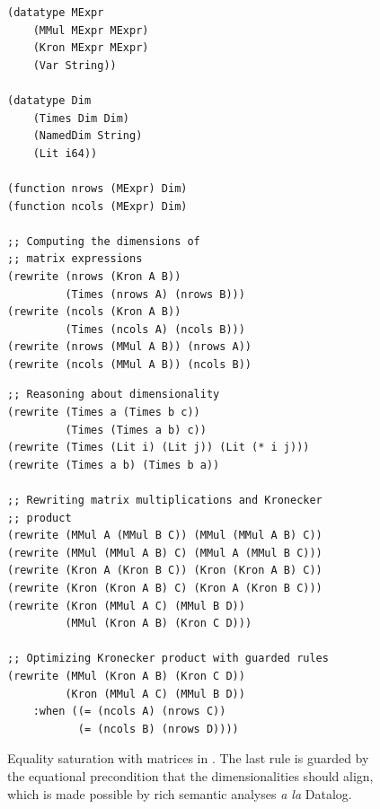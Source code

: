 \begin{figure}
\begin{minipage}[t]{0.42\linewidth}
    \begin{lstlisting}[language=egglog]
(datatype MExpr
    (MMul MExpr MExpr)
    (Kron MExpr MExpr)
    (Var String))

(datatype Dim
    (Times Dim Dim)
    (NamedDim String)
    (Lit i64))

(function nrows (MExpr) Dim)
(function ncols (MExpr) Dim)

;; Computing the dimensions of
;; matrix expressions
(rewrite (nrows (Kron A B))
         (Times (nrows A) (nrows B)))
(rewrite (ncols (Kron A B))
         (Times (ncols A) (ncols B)))
(rewrite (nrows (MMul A B)) (nrows A))
(rewrite (ncols (MMul A B)) (ncols B))
\end{lstlisting}
\end{minipage}
\begin{minipage}[t]{0.50\linewidth}
    \begin{lstlisting}[language=egglog]
;; Reasoning about dimensionality
(rewrite (Times a (Times b c))
         (Times (Times a b) c))
(rewrite (Times (Lit i) (Lit j)) (Lit (* i j)))
(rewrite (Times a b) (Times b a))

;; Rewriting matrix multiplications and Kronecker
;; product
(rewrite (MMul A (MMul B C)) (MMul (MMul A B) C))
(rewrite (MMul (MMul A B) C) (MMul A (MMul B C)))
(rewrite (Kron A (Kron B C)) (Kron (Kron A B) C))
(rewrite (Kron (Kron A B) C) (Kron A (Kron B C)))
(rewrite (Kron (MMul A C) (MMul B D))
         (MMul (Kron A B) (Kron C D)))

;; Optimizing Kronecker product with guarded rules
(rewrite (MMul (Kron A B) (Kron C D))
         (Kron (MMul A C) (MMul B D))
    :when ((= (ncols A) (nrows C))
           (= (ncols B) (nrows D))))
\end{lstlisting}
\end{minipage}
\caption{Equality saturation with matrices in \egglog.
The last rule is guarded by the equational precondition
 that the dimensionalities should align,
 which is made possible by
 rich semantic analyses \textit{a la} Datalog.}
\label{fig:matrix:egglog}
\end{figure}

